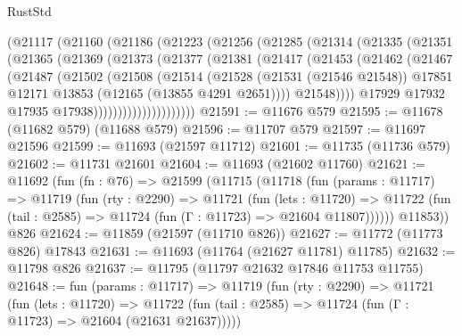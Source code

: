 \begin{lexlean}{RustStd}
\begin{coremodule}
            (@21117
              (@21160
                (@21186
                  (@21223
                    (@21256
                      (@21285
                        (@21314
                          (@21335
                            (@21351
                              (@21365
                                (@21369
                                  (@21373
                                    (@21377
                                      (@21381
                                        (@21417
                                          (@21453
                                            (@21462
                                              (@21467
                                                (@21487
                                                  (@21502
                                                    (@21508
                                                      (@21514
                                                        (@21528
                                                          (@21531 (@21546 @21548))
                                                          @17851
                                                          @12171
                                                          @13853
                                                          (@12165 (@13855 @4291 @2651))))
                                                      @21548))))
                                              @17929
                                              @17932
                                              @17935
                                              @17938)))))))))))))))))))))
@21591 := @11676 @579
@21595 := @11678 (@11682 @579) (@11688 @579)
@21596 := @11707 @579
@21597 := @11697 @21596
@21599 := @11693 (@21597 @11712)
@21601 := @11735 (@11736 @579)
@21602 := @11731 @21601
@21604 := @11693 (@21602 @11760)
@21621 := @11692
    (fun (fn : @76) =>
    @21599
      (@11715
        (@11718
          (fun (params : @11717) =>
          @11719
            (fun (rty : @2290) =>
            @11721
              (fun (lets : @11720) =>
              @11722 (fun (tail : @2585) => @11724 (fun (Γ : @11723) => @21604 @11807))))))
        @11853))
    @826
@21624 := @11859 (@21597 (@11710 @826))
@21627 := @11772 (@11773 @826) @17843
@21631 := @11693 (@11764 (@21627 @11781) @11785)
@21632 := @11798 @826
@21637 := @11795 (@11797 @21632 @17846 @11753 @11755)
@21648 := fun (params : @11717) =>
  @11719
    (fun (rty : @2290) =>
    @11721
      (fun (lets : @11720) =>
      @11722 (fun (tail : @2585) => @11724 (fun (Γ : @11723) => @21604 (@21631 @21637)))))

\end{coremodule}
\end{lexlean}
